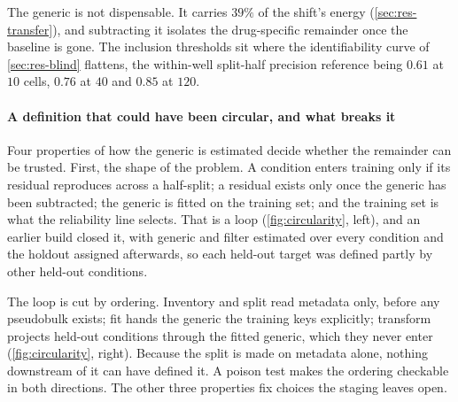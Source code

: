 The generic is not dispensable. It carries $39\%$ of the shift's energy
(\cref{sec:res-transfer}), and subtracting it isolates the drug-specific
remainder once the baseline is gone. The inclusion thresholds sit where the
identifiability curve of \cref{sec:res-blind} flattens, the within-well
split-half precision reference being $0.61$ at $10$ cells, $0.76$ at $40$ and
$0.85$ at $120$.

\paragraph{A definition that could have been circular, and what breaks it} Four
properties of how the generic is estimated decide whether the remainder can be
trusted. First, the shape of the problem. A condition enters training only if its
residual reproduces across a half-split; a residual exists only once the generic
has been subtracted; the generic is fitted on the training set; and the training
set is what the reliability line selects. That is a loop
(\cref{fig:circularity}, left), and an earlier build closed it, with generic and
filter estimated over every condition and the holdout assigned afterwards, so
each held-out target was defined partly by other held-out conditions.

The loop is cut by ordering. Inventory and split read metadata only, before any
pseudobulk exists; fit hands the generic the training keys explicitly; transform
projects held-out conditions through the fitted generic, which they never enter
(\cref{fig:circularity}, right). Because the split is made on metadata alone,
nothing downstream of it can have defined it. A poison test makes the ordering
checkable in both directions. The
other three properties fix choices the staging leaves open.



